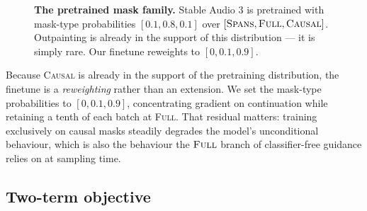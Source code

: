 \documentclass[10pt,twocolumn,letterpaper]{article}
\newcommand{\bm}{\mathbf{m}}
\begin{document}
\begin{figure}[t]
\centering
{}
\caption{\textbf{The pretrained mask family.} Stable Audio 3 is pretrained with mask-type
probabilities $[0.1, 0.8, 0.1]$ over $[\textsc{Spans},\textsc{Full},\textsc{Causal}]$.
Outpainting is already in the support of this distribution --- it is simply rare. Our
finetune reweights to $[0, 0.1, 0.9]$.}
\label{fig:masks}
\end{figure}

Because \textsc{Causal} is already in the support of the pretraining distribution, the
finetune is a \emph{reweighting} rather than an extension. We set the mask-type
probabilities to $[0, 0.1, 0.9]$, concentrating gradient on continuation while retaining
a tenth of each batch at \textsc{Full}. That residual matters: training exclusively on
causal masks steadily degrades the model's unconditional behaviour, which is also the
behaviour the $\textsc{Full}$ branch of classifier-free guidance relies on at sampling
time.

\subsection{Two-term objective}
\end{document}
